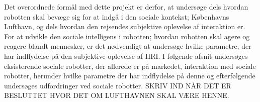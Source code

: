 Det overordnede formål med dette projekt er derfor, at undersøge dels hvordan robotten skal bevæge sig for at indgå i den sociale kontekst; Københavns Lufthavn, og dels hvordan den rejsendes subjektive oplevelse af interaktion er.\blankline
%  
For at udvikle den sociale intelligens i robotten; hvordan robotten skal agere og reagere blandt mennesker, er det nødvendigt at undersøge hvilke parametre, der har indflydelse på den subjektive oplevelse af HRI. I følgende afsnit undersøges eksisterende sociale robotter, der allerede er på markedet, interaktion med sociale robotter, herunder hvilke parametre der har indflydelse på denne og efterfølgende undersøges udfordringer ved sociale robotter. SKRIV IND NÅR DET ER BESLUTTET HVOR DET OM LUFTHAVNEN SKAL VÆRE HENNE.   

